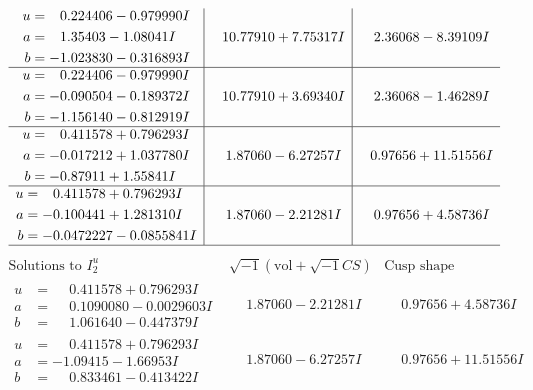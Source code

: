 \documentclass[1p]{elsarticle_modified}
\theoremstyle{definition}
\newcommand{\I}{\sqrt{-1}}
\begin{document}
$$\begin{array}{c|c|c}
\begin{aligned}
u &= \phantom{-}0.224406 - 0.979990 I \\
a &= \phantom{-}1.35403 - 1.08041 I \\
b &= -1.023830 - 0.316893 I\end{aligned}
 & \phantom{-}10.77910 + 7.75317 I & \phantom{-}2.36068 - 8.39109 I \\ \hline\begin{aligned}
u &= \phantom{-}0.224406 - 0.979990 I \\
a &= -0.090504 - 0.189372 I \\
b &= -1.156140 - 0.812919 I\end{aligned}
 & \phantom{-}10.77910 + 3.69340 I & \phantom{-}2.36068 - 1.46289 I \\ \hline\begin{aligned}
u &= \phantom{-}0.411578 + 0.796293 I \\
a &= -0.017212 + 1.037780 I \\
b &= -0.87911 + 1.55841 I\end{aligned}
 & \phantom{-}1.87060 - 6.27257 I & \phantom{-}0.97656 + 11.51556 I \\ \hline\begin{aligned}
u &= \phantom{-}0.411578 + 0.796293 I \\
a &= -0.100441 + 1.281310 I \\
b &= -0.0472227 - 0.0855841 I\end{aligned}
 & \phantom{-}1.87060 - 2.21281 I & \phantom{-}0.97656 + 4.58736 I\\
 \hline 
 \end{array}$$\newpage$$\begin{array}{c|c|c}  
\text{Solutions to }I^u_{2}& \I (\text{vol} + \sqrt{-1}CS) & \text{Cusp shape}\\
 \hline 
\begin{aligned}
u &= \phantom{-}0.411578 + 0.796293 I \\
a &= \phantom{-}0.1090080 - 0.0029603 I \\
b &= \phantom{-}1.061640 - 0.447379 I\end{aligned}
 & \phantom{-}1.87060 - 2.21281 I & \phantom{-}0.97656 + 4.58736 I \\ \hline\begin{aligned}
u &= \phantom{-}0.411578 + 0.796293 I \\
a &= -1.09415 - 1.66953 I \\
b &= \phantom{-}0.833461 - 0.413422 I\end{aligned}
 & \phantom{-}1.87060 - 6.27257 I & \phantom{-}0.97656 + 11.51556 I \\ \hline\begin{aligned}

\end{aligned}
\end{array}$$
\end{document}
